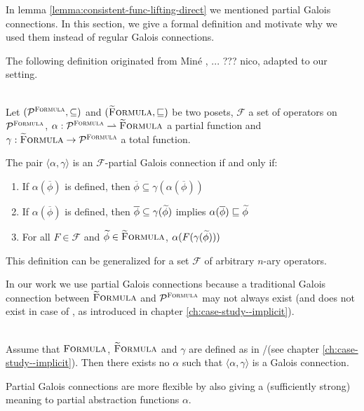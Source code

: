 In lemma \ref{lemma:consistent-func-lifting-direct} we mentioned partial Galois connections.
In this section, we give a formal definition and motivate why we used them instead of regular Galois connections.

The following definition originated from Miné \cite{mine2004weakly}, ... ??? nico, adapted to our setting.
\begin{definition}\label{def:pgc} ~\\
    Let $(\mathcal{P}^{\textup{\textsc{Formula}}}, \subseteq)$ and $(\textup{\textsc{\ensuremath{\widetilde{\text{F}}}ormula}}, \sqsubseteq)$ be two posets, $\mathcal{F}$ a set of operators on $\mathcal{P}^{\textup{\textsc{Formula}}}$, $\alpha : \mathcal{P}^{\textup{\textsc{Formula}}} \rightharpoonup \textup{\textsc{\ensuremath{\widetilde{\text{F}}}ormula}}$ a partial function and $\gamma : \textup{\textsc{\ensuremath{\widetilde{\text{F}}}ormula}} \rightarrow \mathcal{P}^{\textup{\textsc{Formula}}}$ a total function. 
    
    The pair $\langle \alpha, \gamma \rangle$ is an $\mathcal{F}$-partial Galois connection if and only if:
    \begin{enumerate}
        \item If $\alpha(\overline{\phi})$ is defined, then $\overline{\phi} \subseteq \gamma(\alpha(\overline{\phi}))$
        \item If $\alpha(\overline{\phi})$ is defined, then $\overline{\phi} \subseteq \gamma(\widetilde{\phi})$ implies $\alpha(\overline{\phi}) \sqsubseteq \widetilde{\phi}$
        \item For all $F \in \mathcal{F}$ and $\widetilde{\phi} \in \textup{\textsc{\ensuremath{\widetilde{\text{F}}}ormula}}$, $\alpha(F(\gamma(\widetilde{\phi})))$
    \end{enumerate}
This definition can be generalized for a set $\mathcal{F}$ of arbitrary $n$-ary operators.
\end{definition}

In our work we use partial Galois connections because a traditional Galois connection between $\textup{\textsc{\ensuremath{\widetilde{\text{F}}}ormula}}$ and $\mathcal{P}^{\textup{\textsc{Formula}}}$ may not always exist (and does not exist in case of \gvlidf, as introduced in chapter \ref{ch:case-study--implicit}).
\begin{lemma}~\\
    \label{lemma:gc-nonex}
    Assume that $\textup{\textsc{Formula}}$, $\textup{\textsc{\ensuremath{\widetilde{\text{F}}}ormula}}$ and $\gamma$ are defined as in \svlidf/\gvlidf (see chapter \ref{ch:case-study--implicit}).
    Then there exists no $\alpha$ such that $\langle \alpha, \gamma \rangle$ is a Galois connection.
\end{lemma}

Partial Galois connections are more flexible by also giving a (sufficiently strong) meaning to partial abstraction functions $\alpha$.



